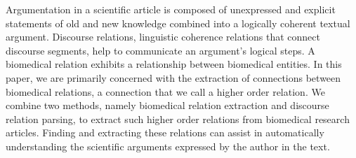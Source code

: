 Argumentation in a scientific article is composed of unexpressed and explicit statements of old and new knowledge combined into a logically coherent textual argument. Discourse relations, linguistic coherence relations that connect discourse segments, help to communicate an argument's logical steps. A biomedical relation exhibits a relationship between biomedical entities. In this paper, we are primarily concerned with the extraction of  connections between biomedical relations, a connection that we call a higher order relation. We combine two methods, namely biomedical relation extraction and discourse relation parsing, to extract such higher order relations from biomedical research articles. Finding and extracting these relations can assist in automatically understanding the scientific arguments expressed by the author in the text.
